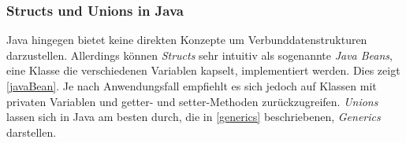 \subsubsection*{Structs und Unions in Java}

Java hingegen bietet keine direkten Konzepte um Verbunddatenstrukturen darzustellen. Allerdings können \textit{Structs} sehr intuitiv als sogenannte \textit{Java Beans}, eine Klasse die verschiedenen  Variablen kapselt, implementiert werden. Dies zeigt \autoref{javaBean}. Je nach Anwendungsfall empfiehlt es sich jedoch auf Klassen mit privaten Variablen und getter- und setter-Methoden zurückzugreifen. \textit{Unions} lassen sich in Java am besten durch, die in \autoref{generics} beschriebenen, \textit{Generics} darstellen.

